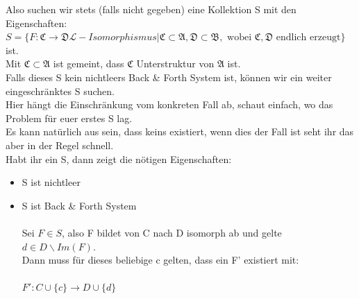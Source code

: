 \documentclass[a4paper]{scrartcl}
\begin{document}
    Also suchen wir stets (falls nicht gegeben) eine Kollektion S mit den Eigenschaften:\\

    $S = \{F: \mathfrak{C} \rightarrow \mathfrak{D} \mathscr{L}-Isomorphismus| \mathfrak{C} \subset \mathfrak{A}, \mathfrak{D} \subset \mathfrak{B},
    \text{ wobei  }\mathfrak{C}, \mathfrak{D} \text{ endlich erzeugt}\}$ ist.\\
    Mit $\mathfrak{C} \subset \mathfrak{A}$ ist gemeint, dass $\mathfrak{C}$ Unterstruktur von $\mathfrak{A}$ ist.\\

    Falls dieses S kein nichtleers Back \& Forth System ist, können wir ein weiter eingeschränktes S suchen.\\
    Hier hängt die Einschränkung vom konkreten Fall ab, schaut einfach, wo das Problem für euer erstes S lag.\\
    Es kann natürlich aus sein, dass keins existiert, wenn dies der Fall ist seht ihr das aber in der Regel schnell.\\

    Habt ihr ein S, dann zeigt die nötigen Eigenschaften:\\
    \begin{itemize}
        \item S ist nichtleer\\
        \item S ist Back \& Forth System\\
            \\
                Sei $F \in S$, also F bildet von C nach D isomorph ab und gelte $d \in D\backslash Im(F)$.\\
                Dann muss für dieses beliebige c gelten, dass ein F' existiert mit:\\
                \\$F': C\cup \{c\} \rightarrow D \cup \{d\} $
    \end{itemize}
\end{document}
